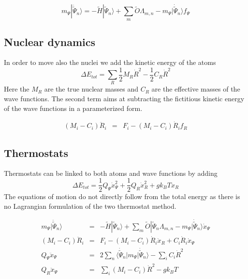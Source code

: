 \documentclass[final,12pt,makeidx,DIV=calc]{article}
\begin{document}
{{{{{{\begin{equation}
m_\Psi|\ddot{\tilde\Psi}_n\rangle=-\tilde{H}|\tilde\Psi_n\rangle
+\sum_m\tilde{O}\Lambda_{m,n}
-m_\Psi|\dot{\tilde\Psi}_n\rangle f_\Psi
\end{equation}

\subsection{Nuclear dynamics}
In order to move also the nuclei we add the kinetic energy of the
atoms
\begin{equation}
\Delta E_{tot}=\sum_R \frac{1}{2}M_R\dot{R}^2-\frac{1}{2}C_R\dot{R}^2
\end{equation}
Here the $M_R$ are the true nuclear masses and $C_R$ are the effective
masses of the wave functions. The second term aims at subtracting the
fictitious kinetic energy of the wave functions in a parameterized form.

\begin{eqnarray*}
(M_i-C_i)\ddot{R}_i&=&F_i-(M_i-C_i)\dot{R}_i f_R
\end{eqnarray*}

\subsection{Thermostats}
Thermostats can be linked to both atoms and wave functions by adding
\begin{equation}
\Delta E_{tot}=\frac{1}{2}Q_\Psi\dot{x}_\Psi^2+\frac{1}{2}Q_R\dot{x}_R^2+gk_BT x_R
\end{equation}
The equations of motion do not directly follow from the total energy
as there is no Lagrangian formulation of the two thermostat method.

\begin{eqnarray*}
m_\Psi|\ddot{\tilde\Psi}_n\rangle&=&-\tilde{H}|\tilde\Psi_n\rangle+
\sum_m\tilde{O}|\tilde\Psi_n\Lambda_{m,n}
-m_\Psi|\dot{\tilde\Psi}_n\rangle \dot{x}_\Psi
\\
(M_i-C_i)\ddot{R}_i&=&F_i-(M_i-C_i)\dot{R}_i\dot{x}_R
+C_i\dot{R}_i\dot{x}_\Psi 
\\
Q_\Psi\ddot{x}_\Psi&=&2\sum_n
\langle\dot{\tilde\Psi}_n|m_\Psi|\dot{\tilde\Psi}_n\rangle 
-\sum_i C_i\dot{R}^2
\\
Q_R\ddot{x}_\Psi&=& \sum_i (M_i-C_i)\dot{R}^2-gk_BT
\end{eqnarray*}

}}}}}}
\end{document}
